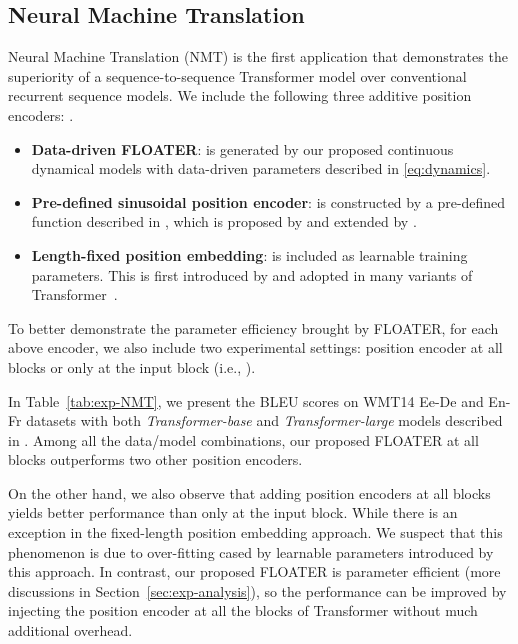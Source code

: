 \documentclass[11pt]{article}
\begin{document}
\subsection{Neural Machine Translation}
\label{sec:exp-nmt}
Neural Machine Translation (NMT) is the first application that demonstrates the superiority of a sequence-to-sequence Transformer model over conventional recurrent sequence models. 
We include the following three additive position encoders: .
\begin{itemize}[nosep,leftmargin=1em,labelwidth=*,align=left]
\item \textbf{Data-driven FLOATER}:  is generated by our proposed continuous dynamical models with data-driven parameters described in \eqref{eq:dynamics}. 
\item \textbf{Pre-defined sinusoidal position encoder}:  is constructed by a pre-defined function described in , which is proposed by \cite{vaswani2017attention} and extended by \cite{dehghani2018universal}.  
\item \textbf{Length-fixed position embedding}:  is included as learnable training parameters. This is first introduced by \cite{vaswani2017attention} and adopted in many variants of Transformer~\cite{devlin2018bert,liu2019roberta}. 
\end{itemize}
To better demonstrate the parameter efficiency brought by FLOATER, for each above encoder, we also include two experimental settings: position encoder at all blocks or only at the input block (i.e., ).

In Table~\ref{tab:exp-NMT}, we present the BLEU scores on WMT14 Ee-De and En-Fr datasets with both \textit{Transformer-base} and \textit{Transformer-large} models described in \cite{vaswani2017attention}.
Among all the data/model combinations, our proposed FLOATER at all blocks outperforms two other position encoders. 

On the other hand, we also observe that adding position encoders at all blocks yields better performance than only at the input block. While there is an exception in the fixed-length position embedding approach. We suspect that this phenomenon is due to over-fitting cased by  learnable parameters introduced by this approach. In contrast, our proposed FLOATER is parameter efficient (more discussions in Section~\ref{sec:exp-analysis}), so the performance can be improved by injecting the position encoder at all the blocks of Transformer without much additional overhead. 
\end{document}
